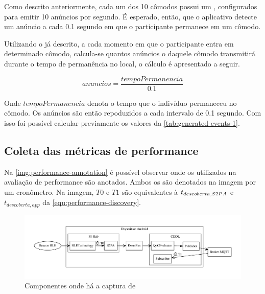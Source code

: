 Como descrito anteriormente, cada um dos 10 cômodos possui um \beacon \ble, configurados para emitir 10 anúncios por segundo. É esperado, então,  que o aplicativo detecte um anúncio a cada 0.1 segundo em que o participante permanece em um cômodo. 

Utilizando o \dataset já descrito, a cada momento em que o participante entra em determinado cômodo, calcula-se quantos anúncios o \beacon daquele cômodo transmitirá durante o tempo de permanência no local, o cálculo é apresentado a seguir.

\begin{equation}
	anuncios = \frac{tempoPermanencia}{0.1} 
\end{equation}

Onde $tempoPermanencia$ denota o tempo que o indivíduo permaneceu no cômodo. Os anúncios são então repoduzidos a cada intervalo de 0.1 segundo. Com isso foi possível calcular previamente os valores da \autoref{tab:generated-events-1}.

\subsection{Coleta das métricas de performance}

Na \autoref{img:performance-annotation} é possível observar onde os \timestamps utilizados na avaliação de performance são anotados. Ambos os \timestamps são denotados na imagem por um cronômetro. Na imagem, $T0$ e $T1$ são equivalentes à $t_{descoberta,S2PA}$ e $t_{descoberta,app}$ da \autoref{equ:performance-discovery}.

\begin{figure}[htb]
	
	\begin{center}

		\caption{\label{img:performance-annotation}Componentes onde há a captura de \timestamps}
		\includegraphics[width=0.95\linewidth]{img/performance-annotation}
		\fonte{\autoriapropria}

	\end{center}
	
\end{figure}

